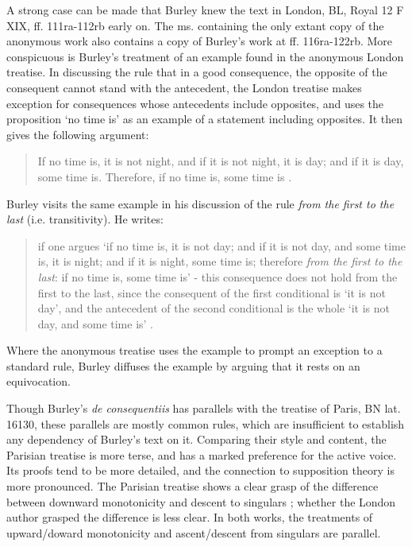 	A strong case can be made that Burley knew the text in London, BL, Royal 12 F XIX, ff. 111ra-112rb early on. The ms. containing the only extant copy of the anonymous work also  contains a copy of Burley's work at ff. 116ra-122rb. More conspicuous is Burley's treatment of an example found in the anonymous London treatise. In discussing the rule that in a good consequence, the opposite of the consequent cannot stand with the antecedent, the London treatise makes exception for consequences whose antecedents include opposites, and uses the proposition `no time is' as an example of a statement including opposites. It then gives the following argument:
	\begin{quote}
		If no time is, it is not night, and if it is not night, it is day; and if it is day, some time is. Therefore, if no time is, some time is \autocite[p. 7, par. 18]{Green-Pedersen1980a}.
	\end{quote}
	Burley visits the same example in his discussion of the rule \textit{from the first to the last} (i.e. transitivity). He writes: 
	\begin{quote}
		if one argues `if no time is, it is not day; and if it is not day, and some time is, it is night; and if it is night, some time is; therefore \textit{from the first to the last}: if no time is, some time is' - this consequence does not hold from the first to the last, since the consequent of the first conditional is `it is not day', and the antecedent of the second conditional is the whole `it is not day, and some time is' \autocite[pp. 114-115, par 8]{Green-Pedersen1980b}.
	\end{quote}
	Where the anonymous treatise uses the example to prompt an exception to a standard rule, Burley diffuses the example by arguing that it rests on an equivocation.
	
	Though Burley's \textit{de consequentiis} has parallels with the treatise of Paris, BN lat. 16130, these parallels are mostly common rules, which are insufficient to establish any dependency of Burley's text on it. Comparing their style and content, the Parisian treatise is more terse, and has a marked preference for the active voice. Its proofs tend to be more detailed, and the connection to supposition theory is more pronounced. The Parisian treatise shows a clear grasp of the difference between downward monotonicity and descent to singulars \autocite[p. 12, par. 2]{Green-Pedersen1980a}; whether the London author grasped the difference is less clear. In both works, the treatments of upward/doward monotonicity and ascent/descent from singulars are parallel.
	

